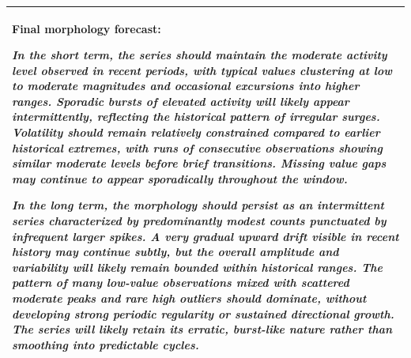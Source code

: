 \documentclass[11pt]{article}
\begin{document}
\begin{table}[t]
\begin{tabular}{p{}}
\hdashline

\colorbox{gray!10}{\parbox{0.95\textwidth}{%
\textbf{Final morphology forecast:}

\textit{In the short term, the series should maintain the moderate activity
level observed in recent periods, with typical values clustering at low to
moderate magnitudes and occasional excursions into higher ranges. Sporadic
bursts of elevated activity will likely appear intermittently, reflecting the
historical pattern of irregular surges. Volatility should remain relatively
constrained compared to earlier historical extremes, with runs of consecutive
observations showing similar moderate levels before brief transitions. Missing
value gaps may continue to appear sporadically throughout the window.}

\textit{In the long term, the morphology should persist as an intermittent
series characterized by predominantly modest counts punctuated by infrequent
larger spikes. A very gradual upward drift visible in recent history may
continue subtly, but the overall amplitude and variability will likely remain
bounded within historical ranges. The pattern of many low-value observations
mixed with scattered moderate peaks and rare high outliers should dominate,
without developing strong periodic regularity or sustained directional growth.
The series will likely retain its erratic, burst-like nature rather than
smoothing into predictable cycles.}
}} \\

\bottomrule
\end{tabular}
\end{table}
\end{document}
